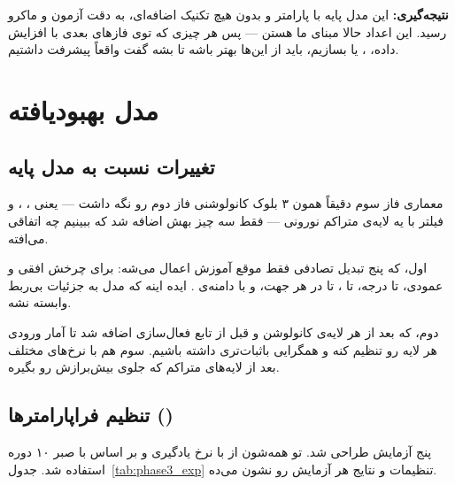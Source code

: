 \documentclass[a4paper,11pt]{article}
\begin{document}
\textbf{نتیجه‌گیری:}
این مدل پایه با  پارامتر و بدون هیچ تکنیک اضافه‌ای، به دقت آزمون  و  ماکرو  رسید. این اعداد حالا مبنای ما هستن — پس هر چیزی که توی فازهای بعدی با افزایش داده، ،  یا  بسازیم، باید از این‌ها بهتر باشه تا بشه گفت واقعاً پیشرفت داشتیم.

\section{مدل  بهبودیافته}

\subsection{تغییرات نسبت به مدل پایه}

معماری فاز سوم دقیقاً همون ۳ بلوک کانولوشنی فاز دوم رو نگه داشت — یعنی ، ، و  فیلتر با یه لایه‌ی متراکم  نورونی — فقط سه چیز بهش اضافه شد که ببینیم چه اتفاقی می‌افته.

اول،  که پنج تبدیل تصادفی فقط موقع آموزش اعمال می‌شه:  برای چرخش افقی و عمودی،  تا  درجه،  تا ،  تا  در هر جهت، و  با دامنه‌ی . ایده اینه که مدل به جزئیات بی‌ربط وابسته نشه.

دوم،  که بعد از هر لایه‌ی کانولوشن و قبل از تابع فعال‌سازی اضافه شد تا آمار ورودی هر لایه رو تنظیم کنه و همگرایی باثبات‌تری داشته باشیم. سوم هم  با نرخ‌های مختلف بعد از لایه‌های متراکم که جلوی بیش‌برازش رو بگیره.

\subsection{تنظیم فراپارامترها ()}

پنج آزمایش طراحی شد. تو همه‌شون از  با نرخ یادگیری  و  بر اساس  با صبر ۱۰ دوره استفاده شد. جدول~\ref{tab:phase3_exp} تنظیمات و نتایج هر آزمایش رو نشون می‌ده.
\end{document}
